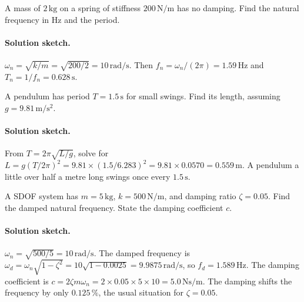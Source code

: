 \begin{exercise}
A mass of $2\,\si{\kilogram}$ on a spring of stiffness $200\,\si{
\newton\per\meter}$ has no damping. Find the natural frequency in Hz
and the period.

\paragraph{Solution sketch.} $\omega_n = \sqrt{k/m} = \sqrt{200/2} =
10\,\si{\radian\per\second}$. Then $f_n = \omega_n/(2\pi) = 1.59\,\si{
\hertz}$ and $T_n = 1/f_n = 0.628\,\si{\second}$.
\end{exercise}

\begin{exercise}
A pendulum has period $T = 1.5\,\si{\second}$ for small swings. Find
its length, assuming $g = 9.81\,\si{\meter\per\second\squared}$.

\paragraph{Solution sketch.} From $T = 2\pi\sqrt{L/g}$, solve for
$L = g(T/2\pi)^2 = 9.81 \times (1.5/6.283)^2 = 9.81 \times 0.0570 =
0.559\,\si{\meter}$. A pendulum a little over half a metre long
swings once every $1.5\,\si{\second}$.
\end{exercise}

\begin{exercise}
A SDOF system has $m = 5\,\si{\kilogram}$, $k = 500\,\si{\newton\per
\meter}$, and damping ratio $\zeta = 0.05$. Find the damped natural
frequency. State the damping coefficient $c$.

\paragraph{Solution sketch.} $\omega_n = \sqrt{500/5} = 10\,\si{
\radian\per\second}$. The damped frequency is $\omega_d = \omega_n
\sqrt{1 - \zeta^2} = 10\sqrt{1 - 0.0025} = 9.9875\,\si{\radian\per
\second}$, so $f_d = 1.589\,\si{\hertz}$. The damping coefficient is
$c = 2\zeta m \omega_n = 2 \times 0.05 \times 5 \times 10 = 5.0\,\si{
\newton\second\per\meter}$. The damping shifts the frequency by only
$0.125\,\%$, the usual situation for $\zeta = 0.05$.
\end{exercise}

